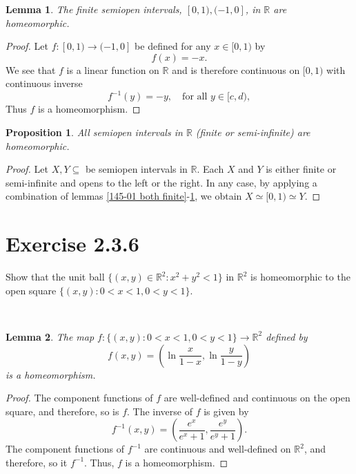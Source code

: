 \documentclass[12pt]{article}
\newtheorem{lemma}{Lemma}
\newtheorem{proposition}{Proposition}
\newenvironment{problem}
    {\begin{lrbox}{\mybox}\begin{minipage}{\textwidth-10pt}}
    {\end{minipage}\end{lrbox}\framebox[6.5in]{\usebox{\mybox}}\\}
\newcommand{\R}{\mathbb{R}}
\begin{document}
\begin{lemma} \label{145-01 flip direction}
    The finite semiopen intervals, $[0,1), (-1,0]$, in $\R$ are homeomorphic.
\end{lemma}

\begin{proof}
    Let $f:[0,1) \to (-1,0]$ be defined for any $x\in[0,1)$ by
    \[f(x) = -x.\]
    We see that $f$ is a linear function on $\R$ and is therefore continuous on $[0,1)$ with continuous inverse
    \[f^{-1}(y) = -y, \quad\text{for all } y\in[c,d),\]
    Thus $f$ is a homeomorphism.
\end{proof}

\begin{proposition}
    All semiopen intervals in $\R$ (finite or semi-infinite) are homeomorphic.
\end{proposition}

\begin{proof}
    Let $X,Y\subseteq$ be semiopen intervals in $\R$. Each $X$ and $Y$ is either finite or semi-infinite and opens to the left or the right. In any case, by applying a combination of lemmas \ref{145-01 both finite}-\ref{145-01 flip direction}, we obtain $X\simeq [0,1) \simeq Y$.
    
\end{proof}

\section*{Exercise 2.3.6}
\begin{problem}
    Show that the unit ball $\{(x,y)\in\R^2 : x^2+y^2 < 1\}$ in $\R^2$ is homeomorphic to the open square $\{(x,y) : 0<x<1, 0<y<1\}$.
\end{problem}

\begin{lemma}
    The map $f:\{(x,y) : 0<x<1, 0<y<1\} \to \R^2$ defined by
    \[f(x,y) = \left(\ln\frac{x}{1-x}, \ln\frac{y}{1-y}\right)\]
    is a homeomorphism.
\end{lemma}

\begin{proof}
    The component functions of $f$ are well-defined and continuous on the open square, and therefore, so is $f$. The inverse of $f$ is given by
    \[f^{-1}(x,y) = \left(\frac{e^x}{e^x+1}, \frac{e^y}{e^y+1}\right).\]
    The component functions of $f^{-1}$ are continuous and well-defined on $\R^2$, and therefore, so it $f^{-1}$. Thus, $f$ is a homeomorphism.
    
\end{proof}
\end{document}
